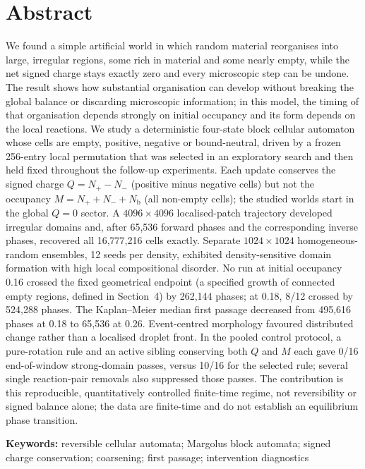 \documentclass[11pt,a4paper]{article}
\begin{document}
\section*{Abstract}
We found a simple artificial world in which random material reorganises into large, irregular regions, some rich in material and some nearly empty, while the net signed charge stays exactly zero and every microscopic step can be undone. The result shows how substantial organisation can develop without breaking the global balance or discarding microscopic information; in this model, the timing of that organisation depends strongly on initial occupancy and its form depends on the local reactions. We study a deterministic four-state block cellular automaton whose cells are empty, positive, negative or bound-neutral, driven by a frozen 256-entry local permutation that was selected in an exploratory search and then held fixed throughout the follow-up experiments. Each update conserves the signed charge $Q=N_{+}-N_{-}$ (positive minus negative cells) but not the occupancy $M=N_{+}+N_{-}+N_{\mathrm b}$ (all non-empty cells); the studied worlds start in the global $Q=0$ sector. A $4096\times4096$ localised-patch trajectory developed irregular domains and, after 65,536 forward phases and the corresponding inverse phases, recovered all 16,777,216 cells exactly. Separate $1024\times1024$ homogeneous-random ensembles, 12 seeds per density, exhibited density-sensitive domain formation with high local compositional disorder. No run at initial occupancy 0.16 crossed the fixed geometrical endpoint (a specified growth of connected empty regions, defined in Section~4) by 262,144 phases; at 0.18, 8/12 crossed by 524,288 phases. The Kaplan--Meier median first passage decreased from 495,616 phases at 0.18 to 65,536 at 0.26. Event-centred morphology favoured distributed change rather than a localised droplet front. In the pooled control protocol, a pure-rotation rule and an active sibling conserving both $Q$ and $M$ each gave 0/16 end-of-window strong-domain passes, versus 10/16 for the selected rule; several single reaction-pair removals also suppressed those passes. The contribution is this reproducible, quantitatively controlled finite-time regime, not reversibility or signed balance alone; the data are finite-time and do not establish an equilibrium phase transition.

\textbf{Keywords:} reversible cellular automata; Margolus block automata; signed charge conservation; coarsening; first passage; intervention diagnostics
\end{document}
